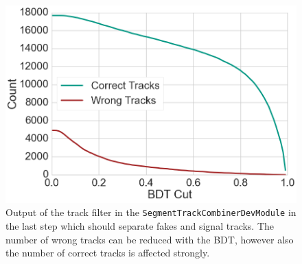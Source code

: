 \begin{figure}
  \centering
  \includegraphics[width=0.7\linewidth]{figures/workflow/track_filter_count.png}
  \caption{Output of the track filter in the \texttt{SegmentTrackCombinerDevModule} in the last step which should separate fakes and signal tracks. The number of wrong tracks can be reduced with the BDT, however also the number of correct tracks is affected strongly.}
  \label{fig-track-filter-count}
\end{figure}

